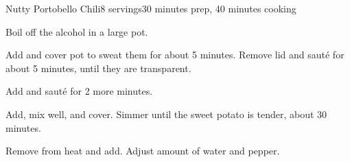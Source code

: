 \documentclass[../Cookbook.tex]{subfiles}
\begin{document}
\begin{recipe}{Nutty Portobello Chili}{8 servings}{30 minutes prep, 40 minutes cooking}

Boil off the alcohol in a large pot.

Add and cover pot to sweat them for about 5 minutes. Remove lid and saut\'e for about 5 minutes, until they are transparent.

Add and saut\'e for 2 more minutes.

Add, mix well, and cover. Simmer until the sweet potato is tender, about 30 minutes.

Remove from heat and add. Adjust amount of water and pepper.

\end{recipe}
\end{document}
